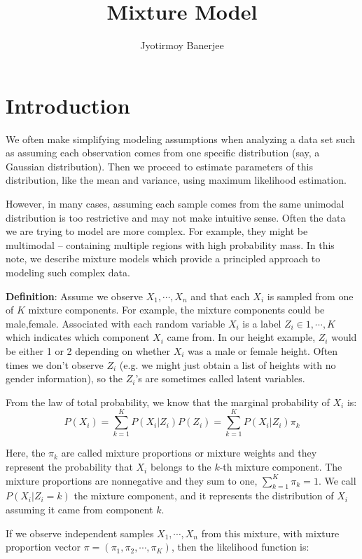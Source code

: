 \documentclass{article}
\title{Mixture Model}
\author{Jyotirmoy Banerjee}
\begin{document}
\maketitle


\section{Introduction}
We often make simplifying modeling assumptions when analyzing a data set such as assuming each observation comes from one specific distribution (say, a Gaussian distribution). Then we proceed to estimate parameters of this distribution, like the mean and variance, using maximum likelihood estimation.

However, in many cases, assuming each sample comes from the same unimodal distribution is too restrictive and may not make intuitive sense. Often the data we are trying to model are more complex. For example, they might be multimodal – containing multiple regions with high probability mass. In this note, we describe mixture models which provide a principled approach to modeling such complex data.


\textbf{Definition}:
Assume we observe $X_1,\cdots,X_n$ and that each $X_i$ is sampled from one of $K$ mixture components. For example, the mixture components could be {male,female}. Associated with each random variable $X_i$ is a label $Z_i \in {1,\cdots,K}$ which indicates which component $X_i$ came from. In our height example, $Z_i$ would be either 1 or 2 depending on whether $X_i$ was a male or female height. Often times we don’t observe $Z_i$ (e.g. we might just obtain a list of heights with no gender information), so the $Z_i$'s are sometimes called latent variables.

From the law of total probability, we know that the marginal probability of $X_i$ is:
\[ P(X_i) = \sum_{k=1}^{K} P(X_i | Z_i) P(Z_i) = \sum_{k=1}^{K} P(X_i | Z_i) \pi_k \]

Here, the $\pi_k$ are called mixture proportions or mixture weights and they represent the probability that $X_i$ belongs to the $k$-th mixture component. The mixture proportions are nonnegative and they sum to one, $\sum_{k=1}^{K} \pi_k = 1$. We call $P(X_i|Z_i=k)$ the mixture component, and it represents the distribution of $X_i$ assuming it came from component $k$.

If we observe independent samples $X_1,\cdots,X_n$ from this mixture, with mixture proportion vector $\pi=(\pi_1,\pi_2,\cdots,\pi_K)$, then the likelihood function is:
\end{document}
